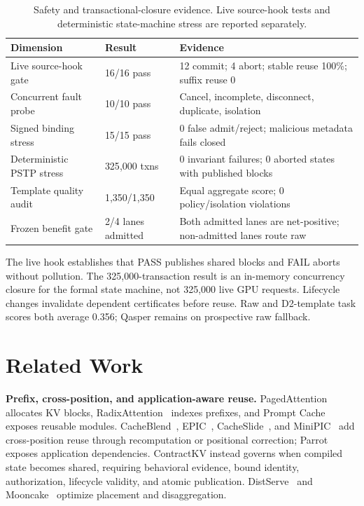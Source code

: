 \documentclass[journal]{IEEEtran}
\begin{document}
\begin{table}[t]
\centering
\caption{Safety and transactional-closure evidence. Live source-hook tests and deterministic state-machine stress are reported separately.}
\label{tab:lifecycle}
\scriptsize
\begin{tabular}{@{}p{2.55cm}p{1.35cm}p{3.55cm}@{}}
\toprule
\textbf{Dimension} & \textbf{Result} & \textbf{Evidence} \\
\midrule
Live source-hook gate & 16/16 pass & 12 commit; 4 abort; stable reuse 100\%; suffix reuse 0 \\
Concurrent fault probe & 10/10 pass & Cancel, incomplete, disconnect, duplicate, isolation \\
Signed binding stress & 15/15 pass & 0 false admit/reject; malicious metadata fails closed \\
Deterministic PSTP stress & 325{,}000 txns & 0 invariant failures; 0 aborted states with published blocks \\
Template quality audit & 1{,}350/1{,}350 & Equal aggregate score; 0 policy/isolation violations \\
Frozen benefit gate & 2/4 lanes admitted & Both admitted lanes are net-positive; non-admitted lanes route raw \\
\bottomrule
\end{tabular}
\end{table}

The live hook establishes that PASS publishes shared blocks and FAIL aborts without pollution. The 325{,}000-transaction result is an in-memory concurrency closure for the formal state machine, not 325{,}000 live GPU requests. Lifecycle changes invalidate dependent certificates before reuse. Raw and D2-template task scores both average 0.356; Qasper remains on prospective raw fallback.

\section{Related Work}
\label{sec:related}

\noindent\textbf{Prefix, cross-position, and application-aware reuse.}
PagedAttention~\cite{vllm2023} allocates KV blocks, RadixAttention~\cite{sglang2024} indexes prefixes, and Prompt Cache~\cite{promptcache2023} exposes reusable modules. CacheBlend~\cite{cacheblend2025}, EPIC~\cite{epic2025}, CacheSlide~\cite{cacheslide2026}, and MiniPIC~\cite{minipic2026} add cross-position reuse through recomputation or positional correction; Parrot~\cite{parrot2024} exposes application dependencies. ContractKV instead governs when compiled state becomes shared, requiring behavioral evidence, bound identity, authorization, lifecycle validity, and atomic publication. DistServe~\cite{distserve2024} and Mooncake~\cite{mooncake2024} optimize placement and disaggregation.
\end{document}

